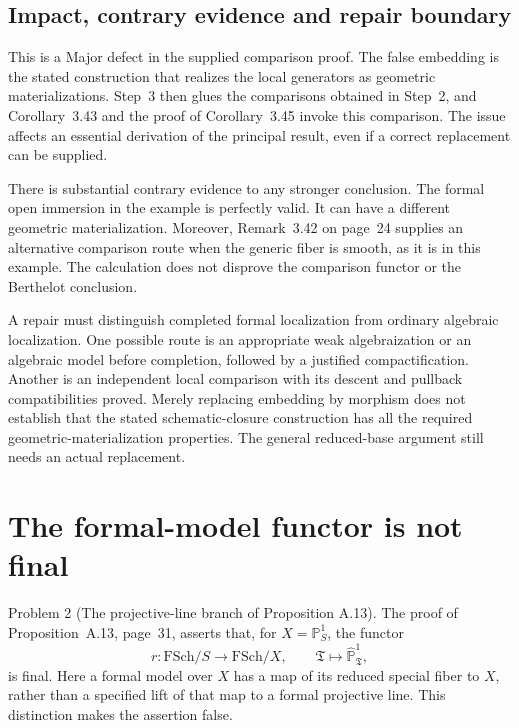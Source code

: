 \documentclass[10pt]{article}
\begin{document}
\subsection*{Impact, contrary evidence and repair boundary}
This is a Major defect in the supplied comparison proof. The false embedding is the stated construction that realizes the local generators as geometric materializations. Step 3 then glues the comparisons obtained in Step 2, and Corollary 3.43 and the proof of Corollary 3.45 invoke this comparison. The issue affects an essential derivation of the principal result, even if a correct replacement can be supplied.\par
There is substantial contrary evidence to any stronger conclusion. The formal open immersion in the example is perfectly valid. It can have a different geometric materialization. Moreover, Remark 3.42 on page 24 supplies an alternative comparison route when the generic fiber is smooth, as it is in this example. The calculation does not disprove the comparison functor or the Berthelot conclusion.\par
A repair must distinguish completed formal localization from ordinary algebraic localization. One possible route is an appropriate weak algebraization or an algebraic model before completion, followed by a justified compactification. Another is an independent local comparison with its descent and pullback compatibilities proved. Merely replacing embedding by morphism does not establish that the stated schematic-closure construction has all the required geometric-materialization properties. The general reduced-base argument still needs an actual replacement.\par
\section*{The formal-model functor is not final}
Problem 2 (The projective-line branch of Proposition A.13).  The proof of Proposition A.13, page 31, asserts that, for \(X=\mathbb P^1_S\), the functor \[r:\mathrm{FSch}/S\longrightarrow\mathrm{FSch}/X,
 \qquad \mathfrak T\longmapsto\widehat{\mathbb P}^1_{\mathfrak T},\] is final. Here a formal model over \(X\) has a map of its reduced special fiber to \(X\), rather than a specified lift of that map to a formal projective line. This distinction makes the assertion false.\par
\end{document}
